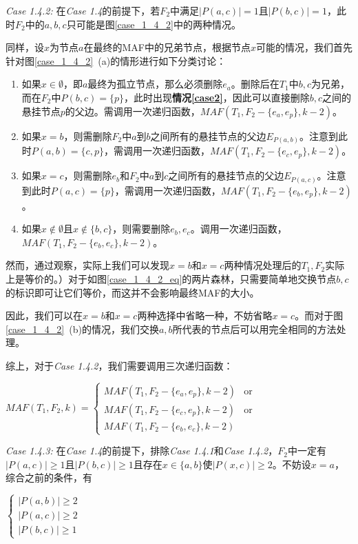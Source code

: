 \textit{Case 1.4.2: }在\textit{Case 1.4}的前提下，若$F_2$中满足$|P(a,c)|=1$且$|P(b,c)|=1$，此时$F_2$中的$a,b,c$只可能是图\ref{case_1_4_2}中的两种情况。

同样，设$x$为节点$a$在最终的MAF中的兄弟节点，根据节点$x$可能的情况，我们首先针对图\ref{case_1_4_2}~(a)的情形进行如下分类讨论：
\begin{enumerate}
	\item 如果$x \in \emptyset$，即$a$最终为孤立节点，那么必须删除$e_a$。删除后在$T_1$中$b,c$为兄弟，而在$F_2$中$P(b,c)=\{p\}$，此时出现\textbf{情况\ref{case2}}，因此可以直接删除$b,c$之间的悬挂节点$p$的父边。需调用一次递归函数，$MAF(T_1,F_2-\{e_a,e_p\},k-2)$。
	\item 如果$x = b$，则需删除$F_2$中$a$到$b$之间所有的悬挂节点的父边$E_{P(a,b)}$。注意到此时$P(a,b)=\{c,p\}$，需调用一次递归函数，$MAF(T_1,F_2-\{e_c,e_p\},k-2)$。
	\item 如果$x = c$，则需删除$e_b$和$F_2$中$a$到$c$之间所有的悬挂节点的父边$E_{P(a,c)}$。注意到此时$P(a,c)=\{p\}$，需调用一次递归函数，$MAF(T_1,F_2-\{e_b,e_p\},k-2)$。
	\item 如果$x \notin \emptyset$且$x \notin \{b,c\}$，则需要删除$e_b,e_c$。调用一次递归函数，$MAF(T_1,F_2-\{e_b,e_c\},k-2)$。
\end{enumerate}

然而，通过观察，实际上我们可以发现$x=b$和$x=c$两种情况处理后的$T_1,F_2$实际上是等价的。）对于如图\ref{case_1_4_2_eq}的两片森林，只需要简单地交换节点$b,c$的标识即可让它们等价，而这并不会影响最终MAF的大小。

因此，我们可以在$x=b$和$x=c$两种选择中省略一种，不妨省略$x=c$。而对于图\ref{case_1_4_2}~(b)的情况，我们交换$a,b$所代表的节点后可以用完全相同的方法处理。

综上，对于\textit{Case 1.4.2}，我们需要调用三次递归函数：
\begin{center}
$MAF(T_1,F_2,k) = \left\{
\begin{array}{lr}
         MAF(T_1,F_2-\{e_a,e_p\},k-2) & \mbox{or}\\ 
         MAF(T_1,F_2-\{e_c,e_p\},k-2) & \mbox{or}\\
         MAF(T_1,F_2-\{e_b,e_c\},k-2) & 
\end{array}
\right.$
\end{center}
$ $\\

\textit{Case 1.4.3: }在\textit{Case 1.4}的前提下，排除\textit{Case 1.4.1}和\textit{Case 1.4.2}，$F_2$中一定有$|P(a,c)| \ge 1$且$|P(b,c)| \ge 1$且存在$x \in \{a,b\}$使$|P(x,c)| \ge 2$。不妨设$x=a$，综合之前的条件，有
\begin{center}
$\left\{
\begin{array}{l}
	|P(a,b)| \ge 2\\
	|P(a,c)| \ge 2\\
	|P(b,c)| \ge 1
\end{array}
\right.$
\end{center}

